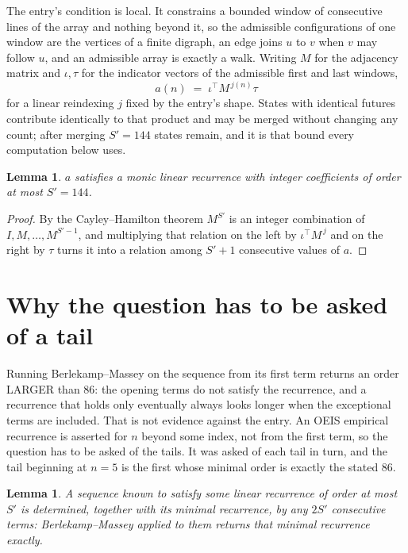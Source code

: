 \documentclass[11pt,a4paper]{article}
\theoremstyle{plain}
\newtheorem{lemma}[theorem]{Lemma}
\theoremstyle{definition}
\begin{document}
The entry's condition is local. It constrains a bounded window of consecutive lines of the
array and nothing beyond it, so the admissible configurations of one window are the vertices of
a finite digraph, an edge joins $u$ to $v$ when $v$ may follow $u$, and an admissible array is
exactly a walk. Writing $M$ for the adjacency matrix and $\iota,\tau$ for the indicator vectors
of the admissible first and last windows,
\[
a(n)\;=\;\iota^{\!\top}M^{\,j(n)}\tau
\]
for a linear reindexing $j$ fixed by the entry's shape. States with identical futures
contribute identically to that product and may be merged without changing any count; after
merging $S'=144$ states remain, and it is that bound every computation below uses.

\begin{lemma}\label{lem:cf}
$a$ satisfies a monic linear recurrence with integer coefficients of order at most $S'=144$.
\end{lemma}

\begin{proof}
By the Cayley--Hamilton theorem $M^{S'}$ is an integer combination of $I,M,\dots,M^{S'-1}$,
and multiplying that relation on the left by $\iota^{\!\top}M^{\,j}$ and on the right by
$\tau$ turns it into a relation among $S'+1$ consecutive values of $a$.
\end{proof}

\section{Why the question has to be asked of a tail}

Running Berlekamp--Massey on the sequence from its first term returns an order LARGER than $86$: the opening terms do not satisfy the recurrence, and a recurrence that holds only eventually always looks longer when the exceptional terms are included. That is not evidence against the entry. An OEIS empirical recurrence is asserted for $n$ beyond some index, not from the first term, so the question has to be asked of the tails. It was asked of each tail in turn, and the tail beginning at $n=5$ is the first whose minimal order is exactly the stated $86$.

\begin{lemma}\label{lem:bm}
A sequence known to satisfy some linear recurrence of order at most $S'$ is determined,
together with its minimal recurrence, by any $2S'$ consecutive terms: Berlekamp--Massey applied
to them returns that minimal recurrence exactly.
\end{lemma}
\end{document}
